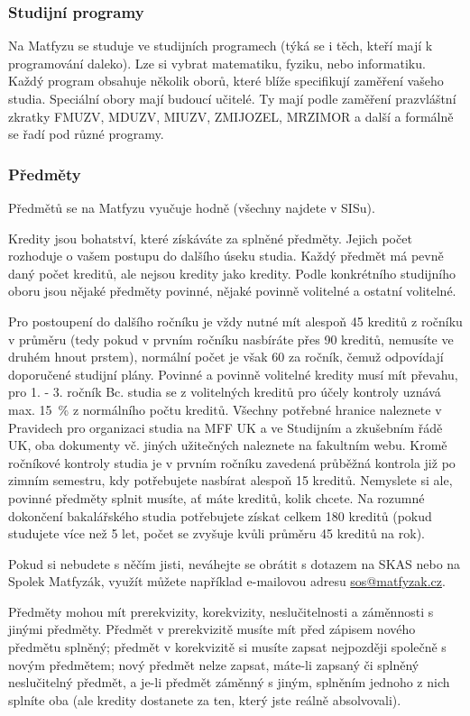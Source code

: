 \subsubsection{Studijní programy}
Na Matfyzu se studuje ve studijních programech (týká se i těch, kteří mají k
programování daleko). Lze si vybrat matematiku, fyziku, nebo informatiku. Každý
program obsahuje několik oborů, které blíže specifikují zaměření vašeho studia.
Speciální obory mají budoucí učitelé. Ty mají podle zaměření prazvláštní zkratky
FMUZV, MDUZV, MIUZV, ZMIJOZEL, MRZIMOR a další a formálně se řadí pod různé
programy.


\subsubsection{Předměty}
Předmětů se na Matfyzu vyučuje hodně (všechny najdete v SISu).

Kredity jsou bohatství, které získáváte za splněné předměty. Jejich počet
rozhoduje o vašem postupu do dalšího úseku studia. 
Každý předmět má pevně daný počet kreditů, ale nejsou kredity jako kredity.
Podle konkrétního studijního oboru jsou nějaké předměty povinné, nějaké povinně
volitelné a ostatní volitelné.

Pro postoupení do dalšího ročníku je vždy nutné mít alespoň 45 kreditů z ročníku
v průměru (tedy pokud v prvním ročníku nasbíráte přes 90 kreditů, nemusíte ve
druhém hnout prstem), normální počet je však 60 za ročník, čemuž odpovídají
doporučené studijní plány. Povinné a povinně volitelné kredity musí mít převahu,
pro 1. - 3. ročník Bc. studia se z volitelných kreditů pro účely kontroly uznává
max. 15~\% z normálního počtu kreditů. Všechny potřebné hranice naleznete v
Pravidech pro organizaci studia na MFF UK a ve Studijním a zkušebním řádě UK,
oba dokumenty vč. jiných užitečných naleznete na fakultním webu. Kromě ročníkové
kontroly studia je v prvním ročníku zavedená průběžná kontrola již po zimním
semestru, kdy potřebujete nasbírat alespoň 15 kreditů. Nemyslete si ale, povinné
předměty splnit musíte, ať máte kreditů, kolik chcete.
Na rozumné dokončení bakalářského studia potřebujete získat celkem 180 kreditů
(pokud studujete více než 5 let, počet se zvyšuje kvůli průměru 45 kreditů na
rok).

Pokud si nebudete s něčím jisti, neváhejte se obrátit s dotazem na SKAS nebo na
Spolek Matfyzák, využít můžete například e-mailovou adresu
\url{sos@matfyzak.cz}.

Předměty mohou mít prerekvizity, korekvizity, neslučitelnosti a záměnnosti s
jinými předměty.
Předmět v prerekvizitě musíte mít před zápisem nového předmětu splněný; předmět
v korekvizitě si musíte zapsat nejpozději společně s novým předmětem; nový
předmět nelze zapsat, máte-li zapsaný či splněný neslučitelný předmět, a je-li
předmět záměnný s jiným, splněním jednoho z nich splníte oba (ale kredity
dostanete za ten, který jste reálně absolvovali).

